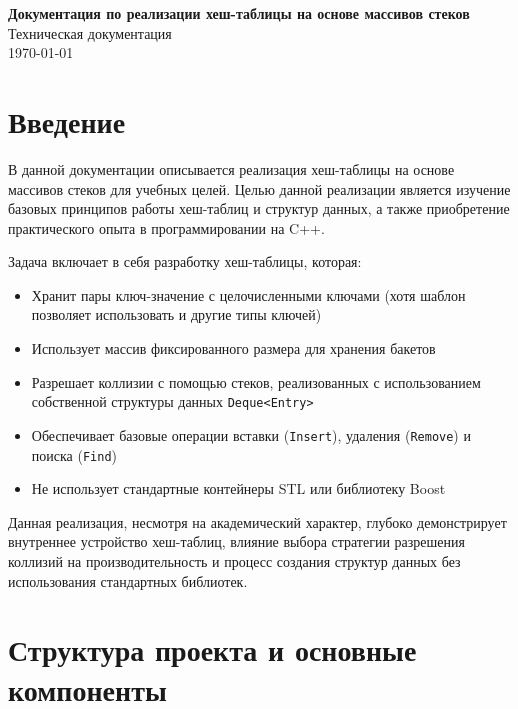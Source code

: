\documentclass[a4paper,12pt]{article}
\begin{document}
\begin{titlepage}
    \begin{center}
        \vspace*{3cm}
        {\LARGE \textbf{Документация по реализации хеш-таблицы на основе массивов стеков}}\\[1cm]
        {\large Техническая документация}\\[5cm]
        {\large \today}
    \end{center}
\end{titlepage}

\tableofcontents
\newpage

\section{Введение}

В данной документации описывается реализация хеш-таблицы на основе массивов стеков для учебных целей. Целью данной реализации является изучение базовых принципов работы хеш-таблиц и структур данных, а также приобретение практического опыта в программировании на C++.

Задача включает в себя разработку хеш-таблицы, которая:
\begin{itemize}
    \item Хранит пары ключ-значение с целочисленными ключами (хотя шаблон позволяет использовать и другие типы ключей)
    \item Использует массив фиксированного размера для хранения бакетов
    \item Разрешает коллизии с помощью стеков, реализованных с использованием собственной структуры данных \texttt{Deque<Entry>}
    \item Обеспечивает базовые операции вставки (\texttt{Insert}), удаления (\texttt{Remove}) и поиска (\texttt{Find})
    \item Не использует стандартные контейнеры STL или библиотеку Boost
\end{itemize}

Данная реализация, несмотря на академический характер, глубоко демонстрирует внутреннее устройство хеш-таблиц, влияние выбора стратегии разрешения коллизий на производительность и процесс создания структур данных без использования стандартных библиотек.

\section{Структура проекта и основные компоненты}
\end{document}
